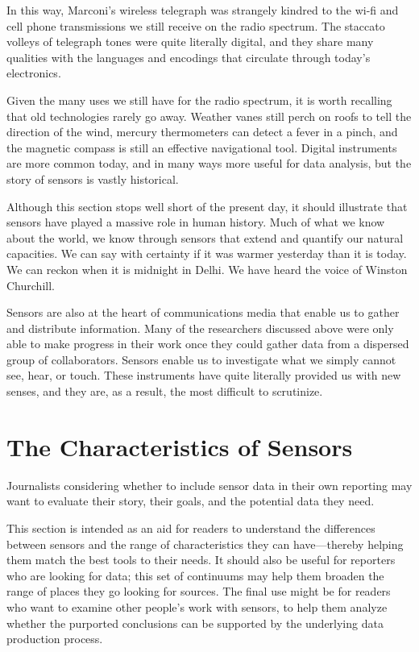 In this way, Marconi's wireless telegraph was strangely kindred to the wi-fi
and cell phone transmissions we still receive on the radio spectrum. The
staccato volleys of telegraph tones were quite literally digital, and they share
many qualities with the languages and encodings that circulate through
today's electronics.

Given the many uses we still have for the radio spectrum, it is worth recalling
that old technologies rarely go away. Weather vanes still perch on roofs
to tell the direction of the wind, mercury thermometers can detect a fever
in a pinch, and the magnetic compass is still an effective navigational tool.
Digital instruments are more common today, and in many ways more useful
for data analysis, but the story of sensors is vastly historical.

Although this section stops well short of the present day, it should illustrate
that sensors have played a massive role in human history. Much of what we
know about the world, we know through sensors that extend and quantify
our natural capacities. We can say with certainty if it was warmer yesterday
than it is today. We can reckon when it is midnight in Delhi. We have heard
the voice of Winston Churchill.

Sensors are also at the heart of communications media that enable us to
gather and distribute information. Many of the researchers discussed above
were only able to make progress in their work once they could gather data from a dispersed group of collaborators. Sensors enable us to investigate
what we simply cannot see, hear, or touch. These instruments have quite
literally provided us with new senses, and they are, as a result, the most difficult
to scrutinize.

\chapter{The Characteristics of Sensors}
Journalists considering whether to include sensor data in their own reporting
may want to evaluate their story, their goals, and the potential data
they need.

This section is intended as an aid for readers to understand the differences
between sensors and the range of characteristics they can have—thereby
helping them match the best tools to their needs. It should also be useful for
reporters who are looking for data; this set of continuums may help them
broaden the range of places they go looking for sources. The final use might
be for readers who want to examine other people's work with sensors, to
help them analyze whether the purported conclusions can be supported by
the underlying data production process.


